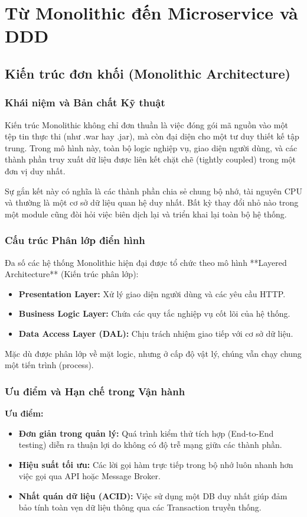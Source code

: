 \documentclass[12pt,a4paper]{report}
\begin{document}
\chapter{Từ Monolithic đến Microservice và DDD}

\section{Kiến trúc đơn khối (Monolithic Architecture)}
\subsection{Khái niệm và Bản chất Kỹ thuật}
Kiến trúc Monolithic không chỉ đơn thuần là việc đóng gói mã nguồn vào một tệp tin thực thi (như .war hay .jar), mà còn đại diện cho một tư duy thiết kế tập trung. Trong mô hình này, toàn bộ logic nghiệp vụ, giao diện người dùng, và các thành phần truy xuất dữ liệu được liên kết chặt chẽ (tightly coupled) trong một đơn vị duy nhất. 

Sự gắn kết này có nghĩa là các thành phần chia sẻ chung bộ nhớ, tài nguyên CPU và thường là một cơ sở dữ liệu quan hệ duy nhất. Bất kỳ thay đổi nhỏ nào trong một module cũng đòi hỏi việc biên dịch lại và triển khai lại toàn bộ hệ thống.

\subsection{Cấu trúc Phân lớp điển hình}
Đa số các hệ thống Monolithic hiện đại được tổ chức theo mô hình **Layered Architecture** (Kiến trúc phân lớp):
\begin{itemize}
    \item \textbf{Presentation Layer:} Xử lý giao diện người dùng và các yêu cầu HTTP.
    \item \textbf{Business Logic Layer:} Chứa các quy tắc nghiệp vụ cốt lõi của hệ thống.
    \item \textbf{Data Access Layer (DAL):} Chịu trách nhiệm giao tiếp với cơ sở dữ liệu.
\end{itemize}

Mặc dù được phân lớp về mặt logic, nhưng ở cấp độ vật lý, chúng vẫn chạy chung một tiến trình (process).

\subsection{Ưu điểm và Hạn chế trong Vận hành}
\textbf{Ưu điểm:}
\begin{itemize}
    \item \textbf{Đơn giản trong quản lý:} Quá trình kiểm thử tích hợp (End-to-End testing) diễn ra thuận lợi do không có độ trễ mạng giữa các thành phần.
    \item \textbf{Hiệu suất tối ưu:} Các lời gọi hàm trực tiếp trong bộ nhớ luôn nhanh hơn việc gọi qua API hoặc Message Broker.
    \item \textbf{Nhất quán dữ liệu (ACID):} Việc sử dụng một DB duy nhất giúp đảm bảo tính toàn vẹn dữ liệu thông qua các Transaction truyền thống.
\end{itemize}
\end{document}
